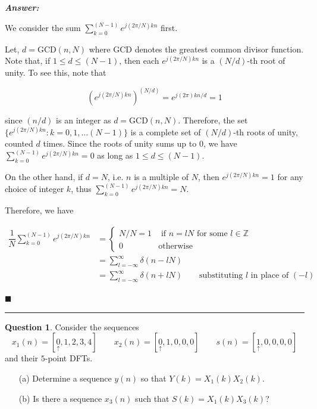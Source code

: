 \documentclass[12pt]{article}
\theoremstyle{definition}
\newtheorem{question}{Question}
\newenvironment{answer}{
    \textbf{\textit{Answer:}} \qquad
}{\hfill $\blacksquare$ \\ \begin{center}
    \rule{0.6\linewidth}{0.5px}    
\end{center}
}
\newcommand{\Z}{\mathbb{Z}}
\begin{document}
\begin{answer}
    We consider the sum $\sum_{k = 0}^{(N-1)} e^{j (2\pi / N)kn}$ first.

    Let, $d = \text{GCD}(n, N)$ where GCD denotes the greatest common divisor function. Note that, if $1 \leq d \leq (N-1)$, then each $e^{j (2\pi / N)kn}$ is a $(N/d)$-th root of unity. To see this, note that 

    $$\left( e^{j (2\pi / N)kn} \right)^{(N/d)} = e^{j(2\pi)kn/d} = 1$$

    since $(n/d)$ is an integer as $d = \text{GCD}(n, N)$. Therefore, the set $\{ e^{j (2\pi / N)kn} : k = 0, 1, \dots (N-1) \}$ is a complete set of $(N/d)$-th roots of unity, counted $d$ times. Since the roots of unity sums up to $0$, we have $\sum_{k = 0}^{(N-1)} e^{j (2\pi / N)kn} = 0$ as long as $1 \leq d \leq (N-1)$. 

    On the other hand, if $d = N$, i.e. $n$ is a multiple of $N$, then $e^{j (2\pi / N)kn} = 1$ for any choice of integer $k$, thus $\sum_{k = 0}^{(N-1)} e^{j (2\pi / N)kn} = N$. 

    Therefore, we have 

    \begin{align*}
        \dfrac{1}{N} \sum_{k = 0}^{(N-1)} e^{j(2\pi/N)kn} 
        & = \begin{cases}
            N/N = 1 & \text{ if } n = lN \text{ for some } l \in \Z\\
            0 & \text{otherwise}
        \end{cases}\\
        & = \sum_{l = -\infty}^{\infty} \delta(n - lN) \\
        & = \sum_{l = -\infty}^{\infty} \delta(n + lN) \qquad \text{substituting } l \text{ in place of } (-l)
    \end{align*}


\end{answer}




\begin{question}
    Consider the sequences
    $$
    x_1(n) = [\underset{\uparrow}{0}, 1, 2, 3, 4]
    \qquad 
    x_2(n) = [\underset{\uparrow}{0}, 1, 0, 0, 0]
    \qquad 
    s(n) = [\underset{\uparrow}{1}, 0, 0, 0, 0]
    $$
    and their $5$-point DFTs.
    \begin{enumerate}
        \item[(a)] Determine a sequence $y(n)$ so that $Y(k) = X_1(k)X_2(k)$.
        \item[(b)] Is there a sequence $x_3(n)$ such that $S(k) = X_1(k)X_3(k)$? 
    \end{enumerate}
\end{question}
\end{document}

